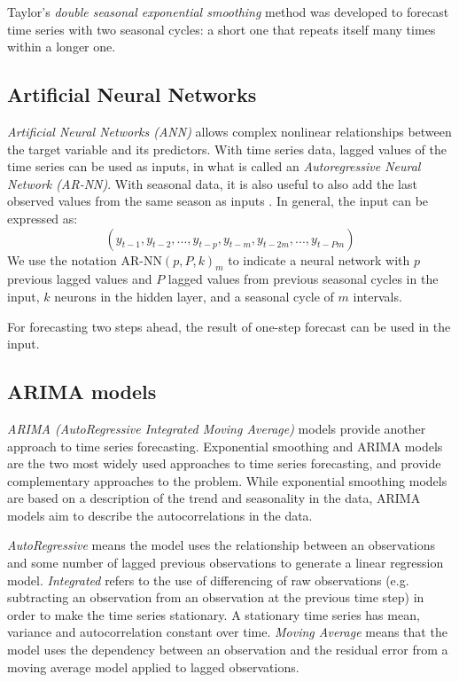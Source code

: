 Taylor’s \emph{double seasonal exponential smoothing} method \cite{taylor} was developed to forecast time series with two seasonal cycles: a short one that repeats itself many times within a longer one.


\subsection{Artificial Neural Networks}
\label{subsec:artificial_neural_networks}
\emph{Artificial Neural Networks (ANN)} allows complex nonlinear relationships between the target variable and its predictors. With time series data, lagged values of the time series can be used as inputs, in what is called an \emph{Autoregressive Neural Network (AR-NN)}. With seasonal data, it is also useful to also add the last observed values from the same season as inputs \cite{hyndman}. In general, the input can be expressed as:
\[ (y_{t-1}, y_{t-2}, ..., y_{t-p}, y_{t-m}, y_{t-2m}, ..., y_{t-Pm}) \]
We use the notation \( \text{AR-NN}(p, P, k)_m \) to indicate a neural network with \( p \) previous lagged values and \( P \) lagged values from previous seasonal cycles in the input, \( k \) neurons in the hidden layer, and a seasonal cycle of \( m \) intervals.

For forecasting two steps ahead, the result of one-step forecast can be used in the input.

\subsection{ARIMA models}
\label{subsec:arima_models}
\emph{ARIMA (AutoRegressive Integrated Moving Average)} models provide another approach to time series forecasting. Exponential smoothing and ARIMA models are the two most widely used approaches to time series forecasting, and provide complementary approaches to the problem. While exponential smoothing models are based on a description of the trend and seasonality in the data, ARIMA models aim to describe the autocorrelations in the data.\cite{hyndman}

\emph{AutoRegressive} means the model uses the relationship between an observations and some number of lagged previous observations to generate a linear regression model. \emph{Integrated} refers to the use of differencing of raw observations (e.g. subtracting an observation from an observation at the previous time step) in order to make the time series stationary. A stationary time series has mean, variance and autocorrelation constant over time. \emph{Moving Average} means that the model uses the dependency between an observation and the residual error from a moving average model applied to lagged observations.

